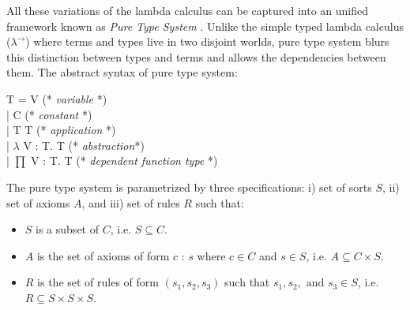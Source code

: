All these variations of the lambda calculus can be captured into an unified framework
known as \textit{Pure Type System} \citep{berardi1988towards} 
\citep{Barendregt:1993:LCT:162552.162561}.  Unlike the simple typed lambda calculus ($\lambda^{\to}$) where 
terms and types live in two disjoint worlds,  pure type system blurs this distinction between 
types and terms and  allows the dependencies between them.  
The abstract syntax  of pure type system:
 \begin{displayquote}

    T = V   (* \textit{variable} *)\\
       |  C   (* \textit{constant} *)\\
       | T T (* \textit{application} *)\\
       | $\lambda$ V : T. T (* \textit{abstraction}*) \\
       | $\prod$ V : T. T  (* \textit{dependent function type} *)
   \end{displayquote}

\noindent
The pure type system is parametrized by three specifications: 
i) set of sorts $S$, ii) set of axioms $A$, and iii) set of rules $R$ such that: 

 \begin{itemize}
	\item $S$ is a subset of  $C$, i.e.  $S \subseteq C$. 
	\item $A$ is the set of axioms of form $c$ : $s$ where $c \in C$ and $s \in S$, i.e.  $A \subseteq C \times S$. 
	\item $R$ is the set of rules of form $(s_{1}, s_{2}, s_{3})$ such that $s_{1}, s_{2}, \text{ and } s_{3} \in S$, i.e.
	 $R \subseteq S \times S \times S$.
 
 \end{itemize}
 
